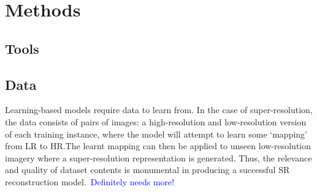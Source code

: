 \chapter{Methods}
\label{chapter2}

\section{Tools}

\section{Data}
Learning-based models require data to learn from. In the case of super-resolution, the data consists of pairs of images: a high-resolution and low-resolution version of each training instance, where the model will attempt to learn some `mapping' from LR to HR.\@ The learnt mapping can then be applied to unseen low-resolution imagery where a super-resolution representation is generated. Thus, the relevance and quality of dataset contents is monumental in producing a successful SR reconstruction model.\ \textcolor{blue}{Definitely needs more!}


